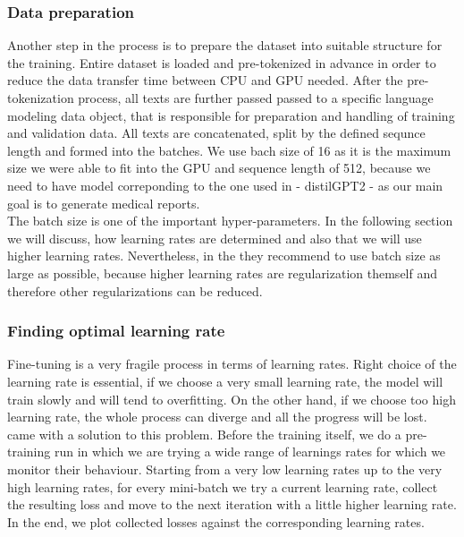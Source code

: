 \subsubsection*{Data preparation}
Another step in the process is to prepare the dataset into suitable structure for the training. Entire dataset is loaded and pre-tokenized in advance in order to reduce the data transfer time between CPU and GPU needed. After the pre-tokenization process, all texts are further passed passed to a specific language modeling data object, that is responsible for preparation and handling of training and validation data. All texts are concatenated, split by the defined sequnce length and formed into the batches. We use bach size of 16 as it is the maximum size we were able to fit into the GPU and sequence length of 512, because we need to have model correponding to the one used in \citet{alfarghaly2021automated} - distilGPT2 - as our main goal is to generate medical reports.\\

The batch size is one of the important hyper-parameters. In the following section we will discuss, how learning rates are determined and also that we will use higher learning rates. Nevertheless, in the \citet{smith2018disciplined} they recommend to use batch size as large as possible, because higher learning rates are regularization themself and therefore other regularizations can be reduced.

\subsubsection*{Finding optimal learning rate}
Fine-tuning is a very fragile process in terms of learning rates. Right choice of the learning rate is essential, if we choose a very small learning rate, the model will train slowly and will tend to overfitting. On the other hand, if we choose too high learning rate, the whole process can diverge and all the progress will be lost.\\

\citet{smith2017cyclical} came with a solution to this problem. Before the training itself, we do a pre-training run in which we are trying a wide range of learnings rates for which we monitor their behaviour. Starting from a very low learning rates up to the very high learning rates, for every mini-batch we try a current learning rate, collect the resulting loss and move to the next iteration with a little higher learning rate. In the end, we plot collected losses against the corresponding learning rates.\\

